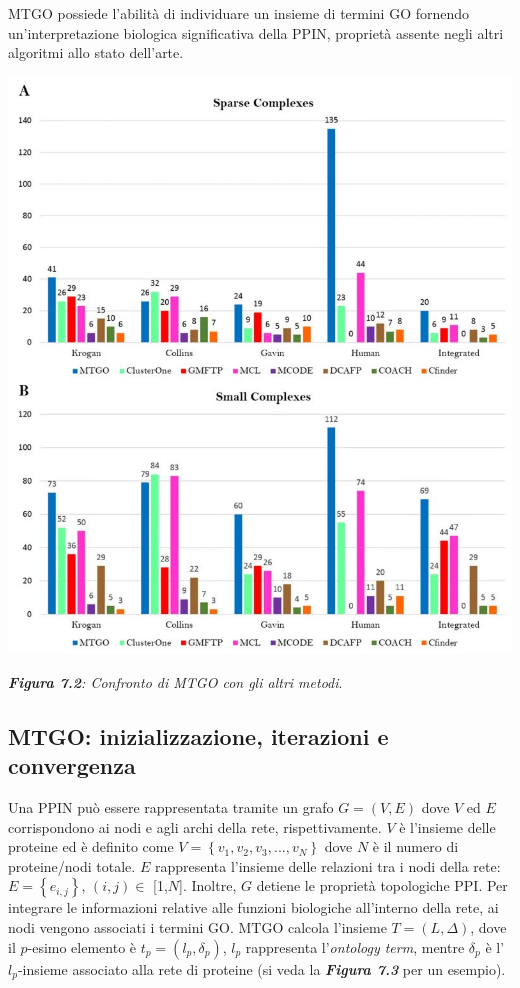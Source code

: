 \documentclass[11pt]{article}
\begin{document}
MTGO possiede l'abilità di individuare un insieme di termini GO fornendo un'interpretazione biologica significativa della PPIN, proprietà assente negli altri algoritmi allo stato dell'arte.\\

\begin{center}
\includegraphics[scale=0.65]{prest1}

\begin{small}\textit{\textbf{Figura 7.2}: Confronto di MTGO con gli altri metodi}.\end{small}
\end{center}

\subsection{MTGO: inizializzazione, iterazioni e convergenza}
Una PPIN può essere rappresentata tramite un grafo $G = (V,E)$ dove $V$ ed $E$ corrispondono ai nodi e agli archi della rete, rispettivamente. $V$ è l'insieme delle proteine ed è definito come $V =\left \{v_1, v_2, v_3, ..., v_N\right \}$ dove $N$ è il numero di proteine/nodi totale. $E$ rappresenta l'insieme delle relazioni tra i nodi della rete: $E = \left \{e_{i,j}\right \}$, $(i,j) \in$ [1,$N$]. Inoltre, $G$ detiene le proprietà topologiche PPI. Per integrare le informazioni relative alle funzioni biologiche all'interno della rete, ai nodi vengono associati i termini GO. MTGO calcola l'insieme $T = (L, \Delta)$, dove il $p$-esimo elemento è $t_p = (l_p, \delta_p)$, $l_p$ rappresenta l'\textit{ontology term}, mentre $\delta_p$ è l'$l_p$-insieme associato alla rete di proteine (si veda la \textit{\textbf{Figura 7.3}} per un esempio).
\end{document}

